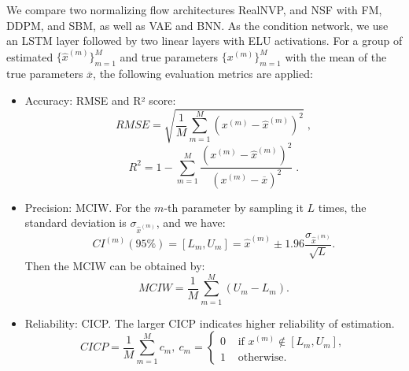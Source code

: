 We compare two normalizing flow architectures \ac{RealNVP}, and \ac{NSF} with \ac{FM}, \ac{DDPM}, and \ac{SBM}, as well as \ac{VAE} and \ac{BNN}. As the condition network, we use an \ac{LSTM} layer followed by two linear layers with \ac{ELU} activations. For a group of estimated $\{ \widehat{x}^{(m)}\}_{m=1}^{M}$ and true parameters $ \{ x^{(m)}\}_{m=1}^{M}$ with the mean of the true parameters $\overline{x}$, the following evaluation metrics are applied:
\begin{itemize}
    \item Accuracy: \ac{RMSE} and R² score:
    \begin{equation}
        RMSE = \sqrt{\frac{1}{M}\sum_{m=1}^M (x^{(m)} - \widehat{x}^{(m)})^2}\;,
    \end{equation}
    \begin{equation}
        R^2 = 1 - \sum_{m=1}^{M}\frac{(x^{(m)}-\widehat{x}^{(m)})^2}{(x^{(m)}-\overline{x})^2}\;.
    \end{equation}

    \item Precision: \ac{MCIW}. For the $m$-th parameter by sampling it $L$ times, the standard deviation is $\sigma_{\widehat{x}^{(m)}}$, and we have:
    \begin{equation}
        CI^{(m)}(95\%)= [L_{m}, U_{m}] = \widehat{x}^{(m)}\pm 1.96\frac{\sigma_{\widehat{x}^{(m)}}}{\sqrt{L}}.
    \end{equation}
    Then the MCIW can be obtained by:
    \begin{equation}
        MCIW = \frac{1}{M}\sum_{m=1}^{M}(U_m - L_m).
    \end{equation}
    \item Reliability: \ac{CICP}. The larger \ac{CICP} indicates higher reliability of estimation.
    \begin{equation}
        CICP = \frac{1}{M}\sum_{m=1}^{M}c_m, \:
        c_m  = \begin{cases}
                0 & \text{ if } x ^{(m)} \notin [L_{m}, U_{m}], \\ 
                1 & \text{ otherwise. } 
              \end{cases}
    \end{equation}
\end{itemize}

